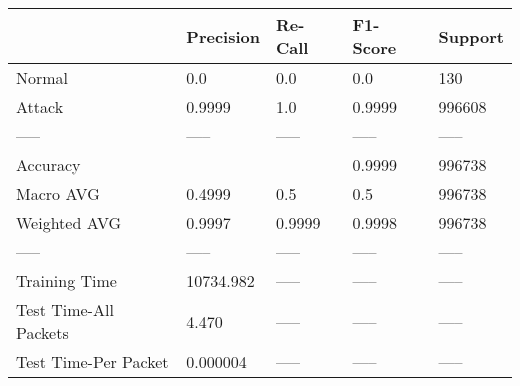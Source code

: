 \begin{tabular}{lllll}
\toprule
{} &  Precision & Re-Call & F1-Score & Support \\
\midrule
Normal                &        0.0 &     0.0 &      0.0 &     130 \\
Attack                &     0.9999 &     1.0 &   0.9999 &  996608 \\
-----                 &      ----- &   ----- &    ----- &   ----- \\
Accuracy              &            &         &   0.9999 &  996738 \\
Macro AVG             &     0.4999 &     0.5 &      0.5 &  996738 \\
Weighted AVG          &     0.9997 &  0.9999 &   0.9998 &  996738 \\
-----                 &      ----- &   ----- &    ----- &   ----- \\
Training Time         &  10734.982 &   ----- &    ----- &   ----- \\
Test Time-All Packets &      4.470 &   ----- &    ----- &   ----- \\
Test Time-Per Packet  &   0.000004 &   ----- &    ----- &   ----- \\
\bottomrule
\end{tabular}
